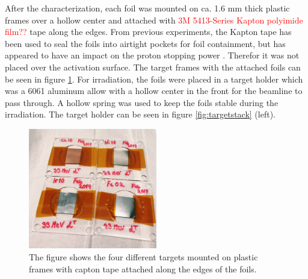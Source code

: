 \noindent 
After the characterization, each foil was mounted on ca. 1.6 mm thick plastic frames over a hollow center and attached with \textcolor{red}{3M 5413-Series Kapton polyimide film??} tape along the edges. From previous experiments, the Kapton tape has been used to seal the foils into airtight pockets for foil containment, but has appeared to have an impact on the proton stopping power \cite{Voyles2019}. Therefor it was not placed over the activation surface. The target frames with the attached foils can be seen in figure \ref{fig:targets_on_frame}. For irradiation, the foils were placed in a target holder which was a 6061 aluminum allow with a hollow center in the front for the beamline to pass through. A hollow spring was used to keep the foils stable during the irradiation. The target holder can be seen in figure \ref{fig:targetstack} (left).    

\begin{figure}
    \centering
    \includegraphics[width=0.5\textwidth]{Experiment/targets_on_frame.JPG}
    \caption{The figure shows the four different targets mounted on plastic frames with capton tape attached along the edges of the foils.}
    \label{fig:targets_on_frame}
\end{figure}


